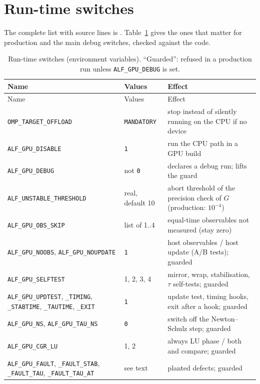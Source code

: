 \section{Run-time switches}
\label{app:switches}

The complete list with source lines is . Table~\ref{tab:switches} gives the ones that matter for production and the main debug switches, checked against the code.

\begin{footnotesize}
\begin{longtable}{@{}>{\raggedright}p{4.3cm}>{\raggedright}p{2.6cm}>{\raggedright\arraybackslash}p{8.0cm}@{}}
\caption{Run-time switches (environment variables). ``Guarded'': refused in a production run unless \texttt{ALF\_GPU\_DEBUG} is set.}\label{tab:switches}\\
\toprule
Name & Values & Effect \\
\midrule\endfirsthead
\toprule Name & Values & Effect \\ \midrule\endhead
\texttt{OMP\_TARGET\_OFFLOAD} & \texttt{MANDATORY} & stop instead of silently running on the CPU if no device \\
\texttt{ALF\_GPU\_DISABLE} & \texttt{1} & run the CPU path in a GPU build \\
\texttt{ALF\_GPU\_DEBUG} & not \texttt{0} & declares a debug run; lifts the guard \\
\texttt{ALF\_UNSTABLE\_THRESHOLD} & real, default 10 & abort threshold of the precision check of $G$ (production: $10^{-4}$) \\
\texttt{ALF\_GPU\_OBS\_SKIP} & list of 1..4 & equal-time observables not measured (stay zero) \\
\texttt{ALF\_GPU\_NOOBS}, \texttt{ALF\_GPU\_NOUPDATE} & \texttt{1} & host observables / host update (A/B tests); guarded \\
\texttt{ALF\_GPU\_SELFTEST} & 1, 2, 3, 4 & mirror, wrap, stabilisation, $\tau$ self-tests; guarded \\
\texttt{ALF\_GPU\_UPDTEST}, \texttt{\_TIMING}, \texttt{\_STABTIME}, \texttt{\_TAUTIME}, \texttt{\_EXIT} & \texttt{1} & update test, timing hooks, exit after a hook; guarded \\
\texttt{ALF\_GPU\_NS}, \texttt{ALF\_GPU\_TAU\_NS} & \texttt{0} & switch off the Newton--Schulz step; guarded \\
\texttt{ALF\_GPU\_CGR\_LU} & 1, 2 & always LU phase / both and compare; guarded \\
\texttt{ALF\_GPU\_FAULT}, \texttt{\_FAULT\_STAB}, \texttt{\_FAULT\_TAU}, \texttt{\_FAULT\_TAU\_AT} & see text & planted defects; guarded \\

\end{longtable}
\end{footnotesize}
